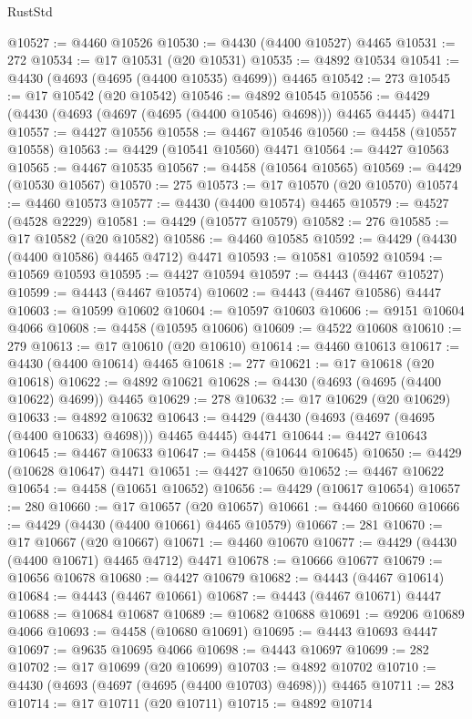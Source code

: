 \begin{lexlean}{RustStd}
\begin{coremodule}
{\begin{coremodule}
{{{{{{{{{{{{{{{{{{{{{{{{{{{{{{{{{{{{{{{{{{{{{{{{{{{{{{{{{{{{{{{{{{{{@10527 := @4460 @10526
@10530 := @4430 (@4400 @10527) @4465
@10531 := 272
@10534 := @17 @10531 (@20 @10531)
@10535 := @4892 @10534
@10541 := @4430 (@4693 (@4695 (@4400 @10535) @4699)) @4465
@10542 := 273
@10545 := @17 @10542 (@20 @10542)
@10546 := @4892 @10545
@10556 := @4429 (@4430 (@4693 (@4697 (@4695 (@4400 @10546) @4698))) @4465 @4445) @4471
@10557 := @4427 @10556
@10558 := @4467 @10546
@10560 := @4458 (@10557 @10558)
@10563 := @4429 (@10541 @10560) @4471
@10564 := @4427 @10563
@10565 := @4467 @10535
@10567 := @4458 (@10564 @10565)
@10569 := @4429 (@10530 @10567)
@10570 := 275
@10573 := @17 @10570 (@20 @10570)
@10574 := @4460 @10573
@10577 := @4430 (@4400 @10574) @4465
@10579 := @4527 (@4528 @2229)
@10581 := @4429 (@10577 @10579)
@10582 := 276
@10585 := @17 @10582 (@20 @10582)
@10586 := @4460 @10585
@10592 := @4429 (@4430 (@4400 @10586) @4465 @4712) @4471
@10593 := @10581 @10592
@10594 := @10569 @10593
@10595 := @4427 @10594
@10597 := @4443 (@4467 @10527)
@10599 := @4443 (@4467 @10574)
@10602 := @4443 (@4467 @10586) @4447
@10603 := @10599 @10602
@10604 := @10597 @10603
@10606 := @9151 @10604 @4066
@10608 := @4458 (@10595 @10606)
@10609 := @4522 @10608
@10610 := 279
@10613 := @17 @10610 (@20 @10610)
@10614 := @4460 @10613
@10617 := @4430 (@4400 @10614) @4465
@10618 := 277
@10621 := @17 @10618 (@20 @10618)
@10622 := @4892 @10621
@10628 := @4430 (@4693 (@4695 (@4400 @10622) @4699)) @4465
@10629 := 278
@10632 := @17 @10629 (@20 @10629)
@10633 := @4892 @10632
@10643 := @4429 (@4430 (@4693 (@4697 (@4695 (@4400 @10633) @4698))) @4465 @4445) @4471
@10644 := @4427 @10643
@10645 := @4467 @10633
@10647 := @4458 (@10644 @10645)
@10650 := @4429 (@10628 @10647) @4471
@10651 := @4427 @10650
@10652 := @4467 @10622
@10654 := @4458 (@10651 @10652)
@10656 := @4429 (@10617 @10654)
@10657 := 280
@10660 := @17 @10657 (@20 @10657)
@10661 := @4460 @10660
@10666 := @4429 (@4430 (@4400 @10661) @4465 @10579)
@10667 := 281
@10670 := @17 @10667 (@20 @10667)
@10671 := @4460 @10670
@10677 := @4429 (@4430 (@4400 @10671) @4465 @4712) @4471
@10678 := @10666 @10677
@10679 := @10656 @10678
@10680 := @4427 @10679
@10682 := @4443 (@4467 @10614)
@10684 := @4443 (@4467 @10661)
@10687 := @4443 (@4467 @10671) @4447
@10688 := @10684 @10687
@10689 := @10682 @10688
@10691 := @9206 @10689 @4066
@10693 := @4458 (@10680 @10691)
@10695 := @4443 @10693 @4447
@10697 := @9635 @10695 @4066
@10698 := @4443 @10697
@10699 := 282
@10702 := @17 @10699 (@20 @10699)
@10703 := @4892 @10702
@10710 := @4430 (@4693 (@4697 (@4695 (@4400 @10703) @4698))) @4465
@10711 := 283
@10714 := @17 @10711 (@20 @10711)
@10715 := @4892 @10714
}}}}}}}}}}}}}}}}}}}}}}}}}}}}}}}}}}}}}}}}}}}}}}}}}}}}}}}}}}}}}}}}}}}}
\end{coremodule}}
\end{coremodule}
\end{lexlean}
